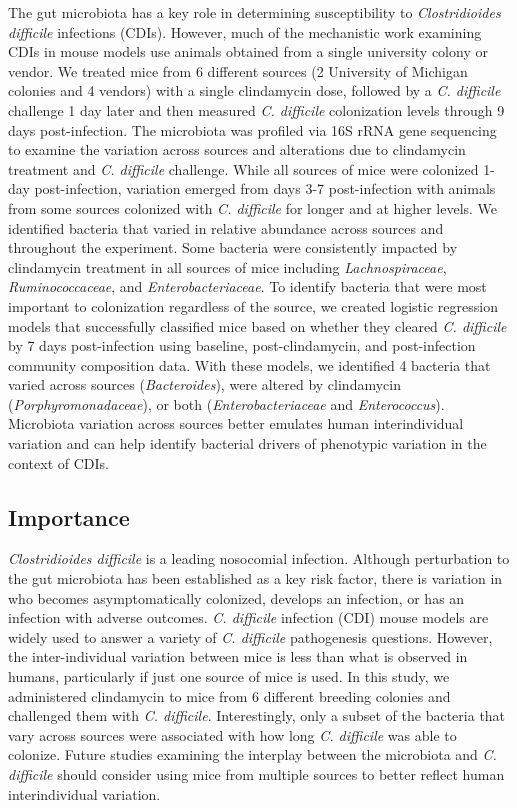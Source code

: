 \documentclass[11pt,]{article}
\begin{document}
The gut microbiota has a key role in determining susceptibility to
\emph{Clostridioides difficile} infections (CDIs). However, much of the
mechanistic work examining CDIs in mouse models use animals obtained
from a single university colony or vendor. We treated mice from 6
different sources (2 University of Michigan colonies and 4 vendors) with
a single clindamycin dose, followed by a \emph{C. difficile} challenge 1
day later and then measured \emph{C. difficile} colonization levels
through 9 days post-infection. The microbiota was profiled via 16S rRNA
gene sequencing to examine the variation across sources and alterations
due to clindamycin treatment and \emph{C. difficile} challenge. While
all sources of mice were colonized 1-day post-infection, variation
emerged from days 3-7 post-infection with animals from some sources
colonized with \emph{C. difficile} for longer and at higher levels. We
identified bacteria that varied in relative abundance across sources and
throughout the experiment. Some bacteria were consistently impacted by
clindamycin treatment in all sources of mice including
\emph{Lachnospiraceae}, \emph{Ruminococcaceae}, and
\emph{Enterobacteriaceae}. To identify bacteria that were most important
to colonization regardless of the source, we created logistic regression
models that successfully classified mice based on whether they cleared
\emph{C. difficile} by 7 days post-infection using baseline,
post-clindamycin, and post-infection community composition data. With
these models, we identified 4 bacteria that varied across sources
(\emph{Bacteroides}), were altered by clindamycin
(\emph{Porphyromonadaceae}), or both (\emph{Enterobacteriaceae} and
\emph{Enterococcus}). Microbiota variation across sources better
emulates human interindividual variation and can help identify bacterial
drivers of phenotypic variation in the context of CDIs.

\subsection{Importance}\label{importance}

\emph{Clostridioides difficile} is a leading nosocomial infection.
Although perturbation to the gut microbiota has been established as a
key risk factor, there is variation in who becomes asymptomatically
colonized, develops an infection, or has an infection with adverse
outcomes. \emph{C. difficile} infection (CDI) mouse models are widely
used to answer a variety of \emph{C. difficile} pathogenesis questions.
However, the inter-individual variation between mice is less than what
is observed in humans, particularly if just one source of mice is used.
In this study, we administered clindamycin to mice from 6 different
breeding colonies and challenged them with \emph{C. difficile}.
Interestingly, only a subset of the bacteria that vary across sources
were associated with how long \emph{C. difficile} was able to colonize.
Future studies examining the interplay between the microbiota and
\emph{C. difficile} should consider using mice from multiple sources to
better reflect human interindividual variation.
\end{document}
